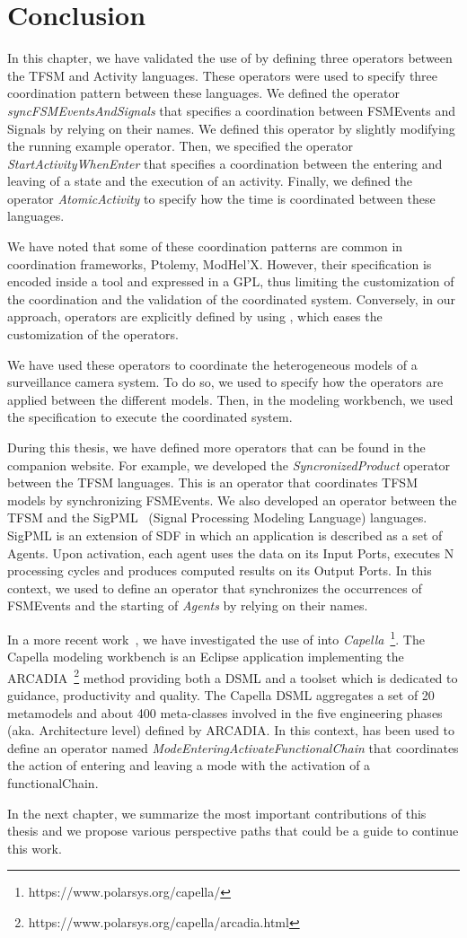 \section{Conclusion}
In this chapter, we have validated the use of \bcool by defining three operators between the TFSM and Activity languages. These operators were used to specify three coordination pattern between these languages. We defined the operator \emph{syncFSMEventsAndSignals} that specifies a coordination between FSMEvents and Signals by relying on their names. We defined this operator by slightly modifying the running example operator. Then, we specified the operator \emph{StartActivityWhenEnter} that specifies a coordination between the entering and leaving of a state and the execution of an activity. Finally, we defined the operator \emph{AtomicActivity} to specify how the time is coordinated between these languages.
	
We have noted that some of these coordination patterns are common in coordination frameworks, \eg Ptolemy, ModHel'X. However, their specification is encoded inside a tool and expressed in a GPL, thus limiting the customization of the coordination and the validation of the coordinated system. Conversely, in our approach, operators are explicitly defined by using \bcool, which eases the customization of the operators.
	
We have used these operators to coordinate the heterogeneous models of a surveillance camera system. To do so, we used \bflow to specify how the operators are applied between the different models. Then, in the modeling workbench, we used the \bflow specification to execute the coordinated system.  
	
	
During this thesis, we have defined more operators that can be found in the companion website. For example, we developed the \emph{SyncronizedProduct} operator between the TFSM languages. This is an operator that coordinates TFSM models by synchronizing FSMEvents. We also developed an operator between the TFSM and the SigPML~\cite{moccmlbib} (Signal Processing Modeling Language) languages. SigPML is an extension of SDF in which an application is described as a set of Agents. Upon activation, each agent uses the data on its Input Ports, executes N processing cycles and produces computed results on its Output Ports. In this context, we used \bcool to define an operator that synchronizes the occurrences of FSMEvents and the starting of \emph{Agents} by relying on their names. 

In a more recent work~\cite{combemaleerts16bib}, we have investigated the use of \bcool into \emph{Capella}~\footnote{https://www.polarsys.org/capella/}. The Capella modeling workbench is an Eclipse application implementing the ARCADIA~\footnote{https://www.polarsys.org/capella/arcadia.html} method providing both a DSML and a toolset which is dedicated to guidance, productivity and quality. The Capella DSML aggregates a set of 20 metamodels and about 400 meta-classes involved in the five engineering phases (aka. Architecture level) defined by ARCADIA. In this context, \bcool has been used to define an operator named \emph{ModeEnteringActivateFunctionalChain} that coordinates the action of entering and leaving a mode with the activation of a functionalChain.
	
In the next chapter, we summarize the most important contributions of this thesis and we propose various perspective paths that could be a guide to continue this work. 
	
